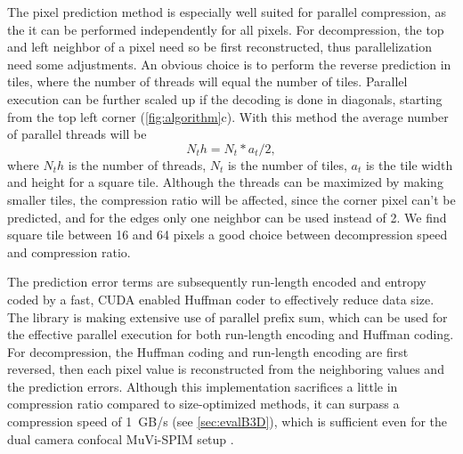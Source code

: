     The pixel prediction method is especially well suited for parallel compression, as the it can be performed independently for all pixels. For decompression, the top and left neighbor of a pixel need so be first reconstructed, thus parallelization need some adjustments. An obvious choice is to perform the reverse prediction in tiles, where the number of threads will equal the number of tiles. Parallel execution can be further scaled up if the decoding is done in diagonals, starting from the top left corner (\autoref{fig:algorithm}c). With this method the average number of parallel threads will be
    \begin{equation}
      N_th = N_t * a_t / 2,
      \label{eq:numThreads}
    \end{equation}
    where $N_th$ is the number of threads, $N_t$ is the number of tiles, $a_t$ is the tile width and height for a square tile. Although the threads can be maximized by making smaller tiles, the compression ratio will be affected, since the corner pixel can't be predicted, and for the edges only one neighbor can be used instead of 2. We find square tile between 16 and 64 pixels a good choice between decompression speed and compression ratio.
    
    The prediction error terms are subsequently run-length encoded and entropy coded by a fast, CUDA enabled Huffman coder \cite{treib_interactive_2012,treib_turbulence_2012} to effectively reduce data size. The library is making extensive use of parallel prefix sum, which can be used for the effective parallel execution for both run-length encoding and Huffman coding. For decompression, the Huffman coding and run-length encoding are first reversed, then each pixel value is reconstructed from the neighboring values and the prediction errors. Although this implementation sacrifices a little in compression ratio compared to size-optimized methods, it can surpass a compression speed of \SI{1}{GB/s} (see \autoref{sec:evalB3D}), which is sufficient even for the dual camera confocal MuVi-SPIM setup \cite{de_medeiros_confocal_2015}.
    
